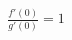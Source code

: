\documentclass[preview]{standalone}
\begin{document}
\begin{align*}
\frac{f'(0)}{g'(0)} = 1
\end{align*}
\end{document}
